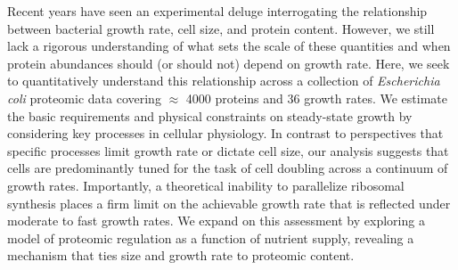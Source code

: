 Recent years have seen an experimental deluge interrogating the relationship
between bacterial growth rate, cell size, and protein content. However, we still
lack a rigorous understanding of what sets the scale of these quantities and
when protein abundances should (or should not) depend on growth rate. Here, we seek to
quantitatively understand this relationship across a collection of
\textit{Escherichia coli} proteomic data covering $\approx$ 4000 proteins and 36
growth rates. We estimate the basic requirements and physical constraints on
steady-state growth by considering key processes in cellular physiology. In
contrast to perspectives that specific processes limit growth rate or dictate
cell size, our analysis suggests that cells are predominantly tuned for the task
of cell doubling across a continuum of growth rates. Importantly, a theoretical
inability to parallelize ribosomal synthesis places a firm limit on the
achievable growth rate that is reflected under moderate to fast growth rates. We
expand on this assessment by exploring a model of proteomic regulation as a
function of nutrient supply, revealing a mechanism that ties size and growth
rate to proteomic content.
